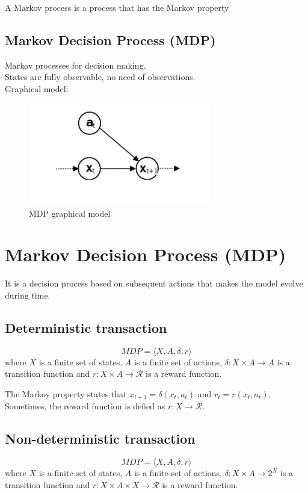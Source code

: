 A Markov process is a process that has the Markov property

\subsection{Markov Decision Process (MDP)}
Markov processes for decision making. \\
States are fully observable, no need of observations. \\
Graphical model:

\begin{figure}[H]
    \centering
    \includegraphics[width=8cm]{images/Reinforcement Learning/mdp.png}
    \caption{MDP graphical model}
    \label{fig:mdp}
\end{figure}

\section{Markov Decision Process (MDP)}
It is a decision process based on subsequent actions that makes the model evolve during time.
\subsection{Deterministic transaction}
\begin{equation}
    MDP = \langle X, A, \delta, r\rangle
\end{equation}
where $X$ is a finite set of states, $A$ is a finite set of actions, $\delta : X \times A \xrightarrow{} A$ is a transition function and $r : X \times A \xrightarrow{} \mathcal{R}$ is a reward function.

The Markov property states that $x_{t+1} = \delta(x_{t}, a_{t})$ and $r_{t} = r(x_{t}, a_{t})$. Sometimes, the reward function is defied as $r: X \xrightarrow{} \mathcal{R}$.

\subsection{Non-deterministic transaction}
\begin{equation}
    MDP = \langle X, A, \delta, r\rangle
\end{equation}
where $X$ is a finite set of states, $A$ is a finite set of actions, $\delta : X \times A \xrightarrow{} 2^{X}$ is a transition function and $r : X \times A \times X \xrightarrow{} \mathcal{R}$ is a reward function.

